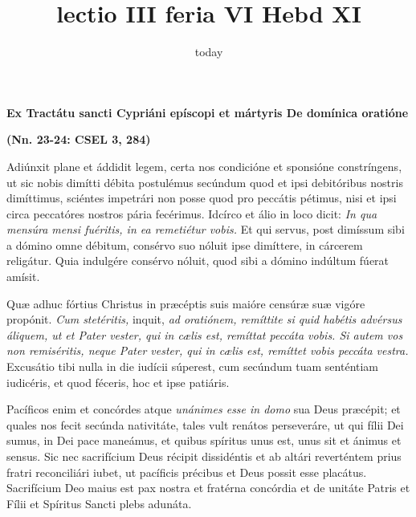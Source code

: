 \documentclass[options]{article}
\title{lectio III feria VI Hebd XI}
\date{today}
\begin{document}
	\textbf{Ex Tractátu sancti Cypriáni epíscopi et mártyris De domínica oratióne }
	
	\textbf{(Nn. 23-24: CSEL 3, 284)}
	
	Adiúnxit plane et áddidit legem, certa nos condicióne et sponsióne constríngens, ut sic nobis dimítti débita postulémus secúndum quod et ipsi debitóribus nostris dimíttimus, sciéntes impetrári non posse quod pro peccátis pétimus, nisi et ipsi circa peccatóres nostros pária fecérimus. Idcírco et álio in loco dicit: 
	\textit{In qua mensúra mensi fuéritis, in ea remetiétur vobis.}
	Et qui servus, post dimíssum sibi a dómino omne débitum, consérvo suo nóluit ipse dimíttere, in cárcerem religátur. Quia indulgére consérvo nóluit, quod sibi a dómino indúltum fúerat amísit. 
	
	
	Quæ adhuc fórtius Christus in præcéptis suis maióre censúræ suæ vigóre propónit. 
	\textit{Cum stetéritis,}
	 inquit,
	\textit{ad oratiónem, remíttite si quid habétis advérsus áliquem, ut et Pater vester, qui in cælis est, remíttat peccáta vobis. Si autem vos non remiséritis, neque Pater vester, qui in cælis est, remíttet vobis peccáta vestra.}
	Excusátio tibi nulla in die iudícii súperest, cum secúndum tuam senténtiam iudicéris, et quod féceris, hoc et ipse patiáris. 
	
	
	Pacíficos enim et concórdes atque 
	\textit{unánimes esse in domo}
	sua Deus præcépit; et quales nos fecit secúnda nativitáte, tales vult renátos perseveráre, ut qui fílii Dei sumus, in Dei pace maneámus, et quibus spíritus unus est, unus sit et ánimus et sensus. Sic nec sacrifícium Deus récipit dissidéntis et ab altári reverténtem prius fratri reconciliári iubet, ut pacíficis précibus et Deus possit esse placátus. Sacrifícium Deo maius est pax nostra et fratérna concórdia et de unitáte Patris et Fílii et Spíritus Sancti plebs adunáta.	
\end{document}
